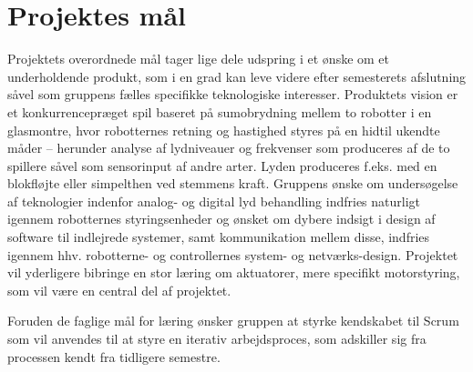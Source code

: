 \section{Projektes mål}
Projektets overordnede mål tager lige dele udspring i et ønske om et underholdende produkt, som i en grad kan leve videre efter semesterets afslutning såvel som gruppens fælles specifikke teknologiske interesser.
Produktets vision er et konkurrencepræget spil baseret på sumobrydning mellem to robotter i en glasmontre, hvor robotternes retning og hastighed styres på en hidtil ukendte måder – herunder analyse af lydniveauer og frekvenser som produceres af de to spillere såvel som sensorinput af andre arter.
Lyden produceres f.eks. med en blokfløjte eller simpelthen ved stemmens kraft.
Gruppens ønske om undersøgelse af teknologier indenfor analog- og digital lyd behandling indfries naturligt igennem robotternes styringsenheder og ønsket om dybere indsigt i design af software til indlejrede systemer, samt kommunikation mellem disse, indfries igennem hhv. robotterne- og controllernes system- og netværks-design.
Projektet vil yderligere bibringe en stor læring om aktuatorer, mere specifikt motorstyring, som vil være en central del af projektet.

Foruden de faglige mål for læring ønsker gruppen at styrke kendskabet til Scrum som vil anvendes til at styre en iterativ arbejdsproces, som adskiller sig fra processen kendt fra tidligere semestre. 